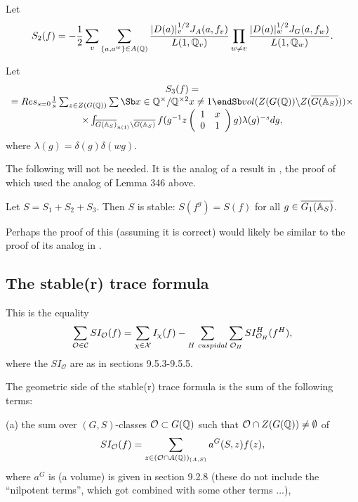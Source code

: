 Let
\begin{equation}
S_2(f)=
-{1\over 2}
\sum_v \sum_{\{a,a^w\}\in A({\Bbb{Q}})}
{|D(a)|^{1/2}_v
J_A(a,f_v)\over L(1,{\Bbb{Q}}_v)}
\prod_{w\not= v}
{|D(a)|^{1/2}_w J_G(a,f_w)\over L(1,{\Bbb{Q}}_w)}.
\end{equation}

Let
\begin{equation}
\begin{array}{c}
S_3(f)=\\
=Res_{s=0}{1\over s}
\sum_{z\in Z(G({\Bbb{Q}}))}
\sum\Sb
x\in {\Bbb{Q}}^\times /{\Bbb{Q}}^{\times 2}
x\not= 1 \endSb
vol(Z(G({\Bbb{Q}}))\backslash Z(\overline{G({\Bbb{A}}_S)}))\times \\
\times
\int_{\overline{G({\Bbb{A}}_S)}_{n(1)}
\backslash \overline{G({\Bbb{A}}_S)}}
f(g^{-1}z
\left(
\begin{array}{cc}
1&x\\ 0&1
\end{array}
\right)
 g)\lambda(g)^{-s}dg ,
\end{array}
\end{equation}
where $\lambda(g)=\delta(g)\delta(wg)$.

The following will not be needed. It is the analog of a result in
\cite{LL}, the proof of which used the analog of Lemma 346 above.
\begin{conjecture}
Let $S=S_1+S_2+S_3$. Then $S$ is stable: 
$S(f^g)=S(f)$ for all $g\in \overline{G_1({\Bbb{A}}_S)}$.
\end{conjecture}

Perhaps the proof of this (assuming it is correct)
would likely be similar to the proof of its analog in \cite{LL}.

\subsection{The stable(r) trace formula}

This is the equality 
\begin{equation}
\sum_{\mathcal{O}\in \mathcal{C}}SI_{\mathcal{O}}(f)
=\sum_{\chi \in {\mathcal{X}}}I_\chi (f)
-\sum_{H\ cuspidal}\sum_{{\cal O}_H}SI_{{\cal O}_H}^H(f^H),
\end{equation}
where the $SI_{\mathcal{O}}$ are as in sections 9.5.3-9.5.5.

The geometric side of the stable(r)
trace formula is the sum of the following terms:

(a) the sum over $(G,S)$-classes ${\cal{O}}\subset G({\Bbb{Q}})$
such that ${\cal{O}}\cap Z(G({\Bbb{Q}}))\not= \emptyset$ of
\begin{equation}
SI_{\cal{O}}(f)=
\sum_{z\in ({\cal{O}}\cap A({\Bbb{Q}}))_{(A,S)}}
a^G(S,z)f(z),
\end{equation}
where $a^G$ is (a volume) is given in section 9.2.8 
(these do not include the ``nilpotent terms'', which
got combined with some other terms ...),

